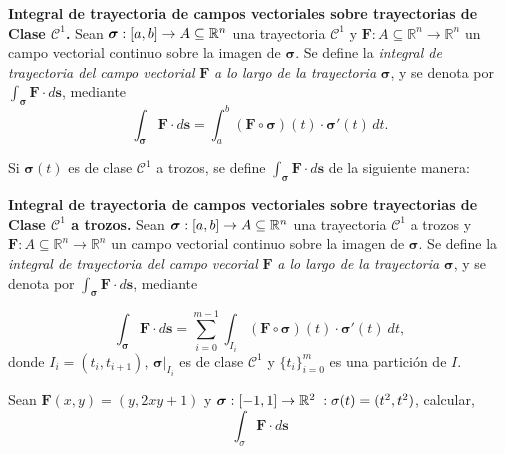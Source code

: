 
\begin{definition}\label{def:Int_tray_vec}\textbf{Integral de trayectoria de campos vectoriales sobre trayectorias de Clase $\mathcal{C}^1$.} Sean $\boldsymbol{\sigma}:[a,b]\to A\subseteq\mathbb{R}^n$ una trayectoria $\mathcal{C}^1$  y  $\mathbf{F}:A\subseteq\mathbb{R}^{n}\to \mathbb{R}^{n}$ un  campo vectorial continuo sobre la imagen de  $\boldsymbol{\sigma}$. Se define la \emph{integral de trayectoria del campo vectorial} $\mathbf{F}$ \emph{a lo largo de la trayectoria} $\boldsymbol{\sigma}$, y se denota por $ \int_{\boldsymbol{\sigma}} \mathbf{F}\cdot d\mathbf{s}$,  mediante
    \[
        \int_{\boldsymbol{\sigma}} \mathbf{F}\cdot d\mathbf{s}=\int_a^b     (\mathbf{F}\circ\boldsymbol{\sigma}) (t) \cdot\boldsymbol{\sigma}'(t) \, dt. 
    \]
\end{definition}

Si $\boldsymbol{\sigma}(t)$ es de clase $\mathcal{C}^1$ a trozos, se define  $\int_{\boldsymbol{\sigma}} \mathbf{F}\cdot d\mathbf{s}$ de la siguiente manera:  

\begin{definition}\label{def:Int_tray_a_trozas_vec}\textbf{Integral de trayectoria de campos vectoriales sobre trayectorias de Clase $\mathcal{C}^1$ a trozos.}    Sean $\boldsymbol{\sigma}:[a,b]\to A\subseteq\mathbb{R}^n$ una trayectoria $\mathcal{C}^1$  a trozos y  $\mathbf{F}:A\subseteq\mathbb{R}^{n}\to \mathbb{R}^{n}$ un  campo vectorial continuo sobre la imagen de  $\boldsymbol{\sigma}$.   Se define la \emph{integral de trayectoria del campo vecorial} $\mathbf{F}$ \emph{a lo largo de la trayectoria} $\boldsymbol{\sigma}$,  y se  denota por $\int_{\boldsymbol{\sigma}} \mathbf{F}\cdot d\mathbf{s}$, mediante
  
    \[
       \int_{\boldsymbol{\sigma}} \mathbf{F}\cdot d\mathbf{s}  =\sum_{i=0}^{m-1}\int_{I_i}  (\mathbf{F} \circ\boldsymbol{\sigma})(t) \cdot \boldsymbol{\sigma}'(t) \:dt,  
    \]
    donde $ I_i= (t_i, t_{i+1})$,  $\boldsymbol{\sigma}\lvert_{I_i}$ es de clase $\mathcal{C}^1$  y  $\{t_i\}_{i=0}^{m}$  es una partici\'on de $I$.
\end{definition}


 \begin{tarea}Sean $\mathbf{F}(x,y) =  (y, 2xy +1) $  y  $\boldsymbol{\sigma}: [-1,1]\to\mathbb{R}^2\;  : \sigma(t) = ( t^{2}, t^{2})$,  calcular,   $$\int_{\sigma}\mathbf{F}\cdot d\mathbf{s}$$
\end{tarea}



